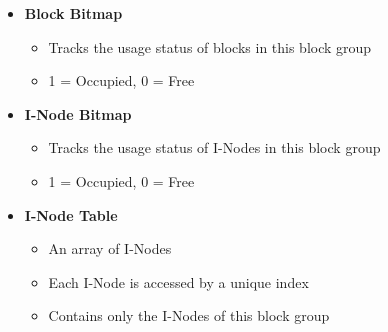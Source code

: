\documentclass[8pt,twocolumn]{article}
\begin{document}
\begin{itemize}
  \setlength{\itemsep}{0pt} %
  \setlength{\parskip}{0pt}
  \item \textbf{Block Bitmap}
\vspace{-0.6em}
  \begin{itemize}
      \item Tracks the usage status of blocks in this block group
      \item 1 = Occupied, 0 = Free
  \end{itemize}
\vspace{-0.6em}
  \item \textbf{I-Node Bitmap}
\vspace{-0.6em}
  \begin{itemize}
    \setlength{\itemsep}{0pt} %
    \setlength{\parskip}{0pt}
      \item Tracks the usage status of I-Nodes in this block group
      \item 1 = Occupied, 0 = Free
  \end{itemize}
\vspace{-0.6em}
  \item \textbf{I-Node Table}
  \vspace{-0.6em}
  \begin{itemize}
    \setlength{\itemsep}{0pt} %
    \setlength{\parskip}{0pt}
      \item An array of I-Nodes
      \item Each I-Node is accessed by a unique index
      \item Contains only the I-Nodes of this block group
  \end{itemize}
\vspace{-0.6em}
\end{itemize}
\vspace{-0.6em}
\noindent{}
\end{document}

